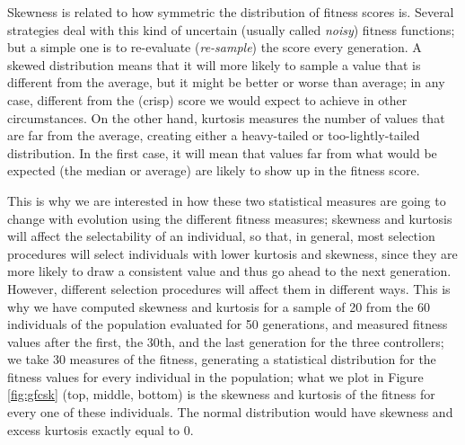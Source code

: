 \documentclass[10pt,journal,compsoc]{IEEEtran}
\begin{document}
Skewness is related to how symmetric the distribution of fitness
scores is. Several strategies deal with this kind of
uncertain (usually called {\em noisy}) fitness functions; but a simple
one is to re-evaluate ({\em re-sample}) the score every generation. A
skewed distribution means that it will more likely to sample a value
that is different from the average, but it might be better or worse
than average; in any case, different from the (crisp) score we would expect to
achieve in other circumstances. On the other hand, kurtosis measures
the number of values that are far from the average, creating either a
heavy-tailed or too-lightly-tailed distribution. In the first case, it
will mean that values far from what would be expected (the median or average) are likely to
show up in the fitness score.

This is why we are interested in how these two statistical measures
are going to change with evolution using the different fitness measures; skewness and kurtosis will  affect the selectability of an individual, so that, in general, most selection procedures will select
individuals with lower kurtosis and skewness, since they are more
likely to draw a consistent value and thus go ahead to the next
generation. However, different selection procedures will affect them
in different ways. This is why we have computed
  skewness and kurtosis for a sample of 20 from the 60 individuals of
  the population evaluated for 50 generations, and measured fitness
  values after the first, the 30th, and the last generation for the three controllers; we take 30 measures of the
  fitness, generating a statistical distribution for the fitness
  values for every individual in the population; what we plot in
Figure \ref{fig:gfcsk} (top, middle, bottom) is the
  skewness and kurtosis of the fitness for every one of these
  individuals. The normal distribution would have skewness and
  excess kurtosis exactly equal to 0.
\end{document}
